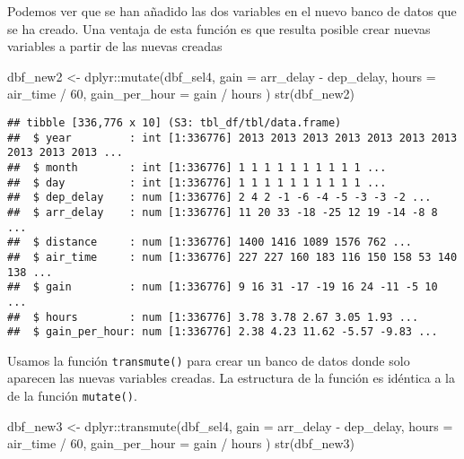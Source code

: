 \documentclass[
]{book}
\newenvironment{Shaded}{\begin{snugshade}}{\end{snugshade}}
\newcommand{\AttributeTok}[1]{\textcolor[rgb]{0.77,0.63,0.00}{#1}}
\newcommand{\DecValTok}[1]{\textcolor[rgb]{0.00,0.00,0.81}{#1}}
\newcommand{\FunctionTok}[1]{\textcolor[rgb]{0.00,0.00,0.00}{#1}}
\newcommand{\NormalTok}[1]{#1}
\newcommand{\OtherTok}[1]{\textcolor[rgb]{0.56,0.35,0.01}{#1}}
\newcommand{\SpecialCharTok}[1]{\textcolor[rgb]{0.00,0.00,0.00}{#1}}
\begin{document}
Podemos ver que se han añadido las dos variables en el nuevo banco de datos que se ha creado. Una ventaja de esta función es que resulta posible crear nuevas variables a partir de las nuevas creadas

\begin{Shaded}
\begin{Highlighting}[]
\NormalTok{dbf\_new2 }\OtherTok{\textless{}{-}}\NormalTok{ dplyr}\SpecialCharTok{::}\FunctionTok{mutate}\NormalTok{(dbf\_sel4,}
  \AttributeTok{gain =}\NormalTok{ arr\_delay }\SpecialCharTok{{-}}\NormalTok{ dep\_delay,}
  \AttributeTok{hours =}\NormalTok{ air\_time }\SpecialCharTok{/} \DecValTok{60}\NormalTok{,}
  \AttributeTok{gain\_per\_hour =}\NormalTok{ gain }\SpecialCharTok{/}\NormalTok{ hours}
\NormalTok{) }
\FunctionTok{str}\NormalTok{(dbf\_new2)}
\end{Highlighting}
\end{Shaded}

\begin{verbatim}
## tibble [336,776 x 10] (S3: tbl_df/tbl/data.frame)
##  $ year         : int [1:336776] 2013 2013 2013 2013 2013 2013 2013 2013 2013 2013 ...
##  $ month        : int [1:336776] 1 1 1 1 1 1 1 1 1 1 ...
##  $ day          : int [1:336776] 1 1 1 1 1 1 1 1 1 1 ...
##  $ dep_delay    : num [1:336776] 2 4 2 -1 -6 -4 -5 -3 -3 -2 ...
##  $ arr_delay    : num [1:336776] 11 20 33 -18 -25 12 19 -14 -8 8 ...
##  $ distance     : num [1:336776] 1400 1416 1089 1576 762 ...
##  $ air_time     : num [1:336776] 227 227 160 183 116 150 158 53 140 138 ...
##  $ gain         : num [1:336776] 9 16 31 -17 -19 16 24 -11 -5 10 ...
##  $ hours        : num [1:336776] 3.78 3.78 2.67 3.05 1.93 ...
##  $ gain_per_hour: num [1:336776] 2.38 4.23 11.62 -5.57 -9.83 ...
\end{verbatim}

Usamos la función \texttt{transmute()} para crear un banco de datos donde solo aparecen las nuevas variables creadas. La estructura de la función es idéntica a la de la función \texttt{mutate()}.

\begin{Shaded}
\begin{Highlighting}[]
\NormalTok{dbf\_new3 }\OtherTok{\textless{}{-}}\NormalTok{ dplyr}\SpecialCharTok{::}\FunctionTok{transmute}\NormalTok{(dbf\_sel4,}
  \AttributeTok{gain =}\NormalTok{ arr\_delay }\SpecialCharTok{{-}}\NormalTok{ dep\_delay,}
  \AttributeTok{hours =}\NormalTok{ air\_time }\SpecialCharTok{/} \DecValTok{60}\NormalTok{,}
  \AttributeTok{gain\_per\_hour =}\NormalTok{ gain }\SpecialCharTok{/}\NormalTok{ hours}
\NormalTok{) }
\FunctionTok{str}\NormalTok{(dbf\_new3)}
\end{Highlighting}
\end{Shaded}
\end{document}
